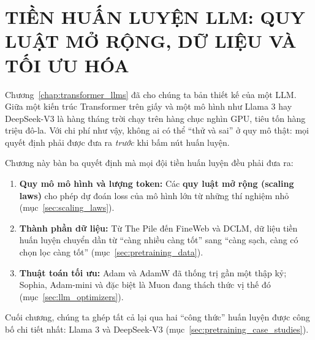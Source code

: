 
\chapter{TIỀN HUẤN LUYỆN LLM: QUY LUẬT MỞ RỘNG, DỮ LIỆU VÀ TỐI ƯU HÓA}
\label{chap:pretraining}

Chương~\ref{chap:transformer_llms} đã cho chúng ta bản thiết kế của một LLM. Giữa một kiến trúc Transformer trên giấy và một mô hình như Llama 3 hay DeepSeek-V3 là hàng tháng trời chạy trên hàng chục nghìn GPU, tiêu tốn hàng triệu đô-la. Với chi phí như vậy, không ai có thể “thử và sai” ở quy mô thật: mọi quyết định phải được đưa ra \emph{trước} khi bấm nút huấn luyện.

Chương này bàn ba quyết định mà mọi đội tiền huấn luyện đều phải đưa ra:
\begin{enumerate}
	\item \textbf{Quy mô mô hình và lượng token:} Các \textbf{quy luật mở rộng (scaling laws)} cho phép dự đoán loss của mô hình lớn từ những thí nghiệm nhỏ (mục~\ref{sec:scaling_laws}).
	\item \textbf{Thành phần dữ liệu:} Từ The Pile đến FineWeb và DCLM, dữ liệu tiền huấn luyện chuyển dần từ “càng nhiều càng tốt” sang “càng sạch, càng có chọn lọc càng tốt” (mục~\ref{sec:pretraining_data}).
	\item \textbf{Thuật toán tối ưu:} Adam và AdamW đã thống trị gần một thập kỷ; Sophia, Adam-mini và đặc biệt là Muon đang thách thức vị thế đó (mục~\ref{sec:llm_optimizers}).
\end{enumerate}
Cuối chương, chúng ta ghép tất cả lại qua hai “công thức” huấn luyện được công bố chi tiết nhất: Llama 3 và DeepSeek-V3 (mục~\ref{sec:pretraining_case_studies}).
